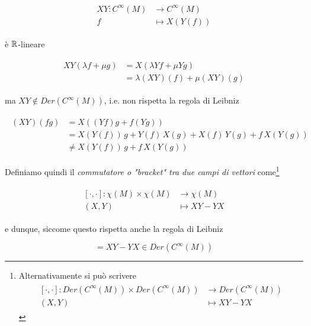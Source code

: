 \begin{align}
	\begin{split}
		X Y : C^{\infty}(M) &\to C^{\infty}(M)\\
		f &\mapsto X(Y(f))
	\end{split}
\end{align}

è $ \mathbb{R} $-lineare

\begin{align}
	\begin{split}
		X Y (\lambda f + \mu g) &= X (\lambda Y f + \mu Y g)\\
		&= \lambda (XY)(f) + \mu (XY)(g)
	\end{split}
\end{align}

ma $ XY \notin Der(C^{\infty}(M)) $, i.e. non rispetta la regola di Leibniz

\begin{align}
	\begin{split}
		(XY)(fg) &= X ((Yf) g + f (Y g))\\
		&= X(Y(f)) \, g + Y(f) \, X(g) + X(f) \, Y(g) + f \, X(Y(g))\\
		&\neq X(Y(f)) \, g + f \, X(Y(g))
	\end{split}
\end{align}

Definiamo quindi il \textit{commutatore o "bracket" tra due campi di vettori} come\footnote{%
	Alternativamente si può scrivere
	\begin{align}
		\begin{split}
			[\cdot,\cdot] : Der(C^{\infty}(M)) \times Der(C^{\infty}(M)) &\to Der(C^{\infty}(M))\\
			(X,Y) &\mapsto XY-YX
		\end{split}
	\end{align}%
}

\begin{align}
	\begin{split}
		[\cdot,\cdot] : \chi(M) \times \chi(M) &\to \chi(M)\\
		(X,Y) &\mapsto XY-YX
	\end{split}
\end{align}

e dunque, siccome questo rispetta anche la regola di Leibniz

\begin{equation}
	[X,Y] = XY-YX \in Der(C^{\infty}(M))
\end{equation}

